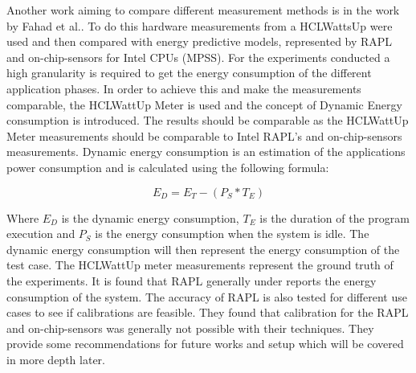 
Another work aiming to compare different measurement methods is in the work by Fahad et al.\cite{fahad2019comparative}. To do this hardware measurements from a HCLWattsUp were used and then compared with energy predictive models, represented by RAPL and on-chip-sensors for Intel CPUs (MPSS). For the experiments conducted a high granularity is required to get the energy consumption of the different application phases. In order to achieve this and make the measurements comparable, the HCLWattUp Meter is used and the concept of Dynamic Energy consumption is introduced. The results should be comparable as the HCLWattUp Meter measurements should be comparable to Intel RAPL's and on-chip-sensors measurements. Dynamic energy consumption is an estimation of the applications power consumption and is calculated using the following formula:\cite{fahad2019comparative}

\begin{equation}
    E_D = E_T -(P_S * T_E)
\end{equation}

Where $E_D$ is the dynamic energy consumption, $T_E$ is the duration of the program execution and $P_S$ is the energy consumption when the system is idle. The dynamic energy consumption will then represent the energy consumption of the test case. The HCLWattUp meter measurements represent the ground truth of the experiments. It is found that RAPL generally under reports the energy consumption of the system. The accuracy of RAPL is also tested for different use cases to see if calibrations are feasible. They found that calibration for the RAPL and on-chip-sensors was generally not possible with their techniques. They provide some recommendations for future works and setup which will be covered in more depth later.